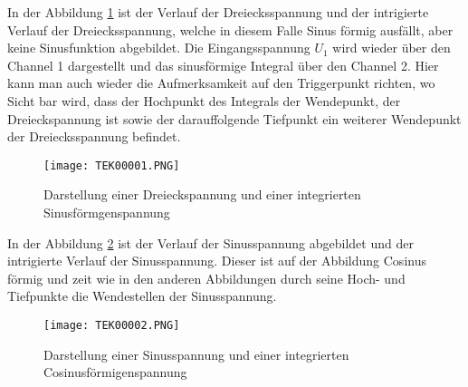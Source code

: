 \newpage
In der Abbildung \ref{fig:Versuch2/Darstellung einer Dreieckspannung und einer integrierten Sinusförmigenspannung} ist der Verlauf der Dreiecksspannung und der intrigierte Verlauf der Dreiecksspannung, welche in diesem Falle Sinus förmig ausfällt, aber keine Sinusfunktion abgebildet. Die Eingangsspannung $U_1$ wird wieder über den Channel 1 dargestellt und das sinusförmige Integral über den Channel 2. Hier kann man auch wieder die Aufmerksamkeit auf den Triggerpunkt richten, wo Sicht bar wird, dass der Hochpunkt des Integrals der Wendepunkt, der Dreieckspannung ist sowie der darauffolgende Tiefpunkt ein weiterer Wendepunkt der Dreiecksspannung befindet.    
\begin{figure}[H]
    \centering
    \texttt{[image: TEK00001.PNG]}
    \caption{Darstellung einer Dreieckspannung und einer integrierten Sinusförmgenspannung}
    \label{fig:Versuch2/Darstellung einer Dreieckspannung und einer integrierten Sinusförmigenspannung}
\end{figure}
In der Abbildung \ref{fig:Versuch2/Darstellung einer Sinusspannung und einer integrierten Cosinusförmigenspannung} ist der Verlauf der Sinusspannung abgebildet und der intrigierte Verlauf der Sinusspannung. Dieser ist auf der Abbildung Cosinus förmig und zeit wie in den anderen Abbildungen durch seine Hoch- und Tiefpunkte die Wendestellen der Sinusspannung.      
\begin{figure}[H]
    \centering
    \texttt{[image: TEK00002.PNG]}
    \caption{Darstellung einer Sinusspannung und einer integrierten Cosinusförmigenspannung}
    \label{fig:Versuch2/Darstellung einer Sinusspannung und einer integrierten Cosinusförmigenspannung}
\end{figure}
